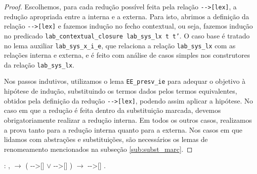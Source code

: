 \begin{addmargin}[1em]{2em}
\begin{proof}
Escolhemos, para cada redução possível feita pela relação
\texttt{-{}->[lex]}, a redução apropriada entre a interna e a externa.  Para
isto, abrimos a definição da relação \texttt{-{}->[lex]} e fazemos indução no
fecho contextual, ou seja, fazemos indução no predicado
\texttt{lab\_contextual\_closure lab\_sys\_lx t t'}. O caso base é tratado no
lema auxiliar \texttt{lab\_sys\_x\_i\_e}, que relaciona a relação
\texttt{lab\_sys\_lx} com as relações interna e externa, e é feito com análise
de casos simples nos construtores da relação \texttt{lab\_sys\_lx}. 

Nos passos indutivos, utilizamos o lema \texttt{EE\_presv\_ie} para adequar o
objetivo à hipótese de indução, substituindo os termos dados pelos termos
equivalentes, obtidos pela definição da redução \texttt{-{}->[lex]}, podendo assim
aplicar a hipótese. No caso em que a redução é feita dentro da substituição
marcada, devemos obrigatoriamente realizar a redução interna. Em todos os outros
casos, realizamos a prova tanto para a redução interna quanto para a externa.
Nos casos em que lidamos com abstrações e substituições, são necessários os
lemas de renomeamento mencionados na subseção \ref{sub:subst_marc}.
\end{proof}

\end{addmargin}

\bigskip

\coqdocnoindent {} :
\coqdockw{\ensuremath{\forall}}  ,
  \ensuremath{\rightarrow} (
-{}->[]  \ensuremath{\lor} 
-{}->[] ) \ensuremath{\rightarrow} 
-{}->[] .\coqdoceol


